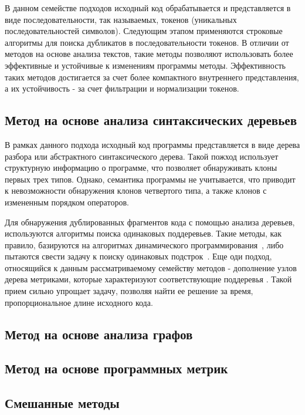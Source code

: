 В данном семействе подходов исходный код обрабатывается и представляется в виде последовательности, так называемых, токенов (уникальных последовательностей символов). Следующим этапом применяются строковые алгоритмы для поиска дубликатов в последовательности токенов. В отличии от методов на основе анализа текстов, такие методы позволяют использовать более эффективные и устойчивые к изменениям программы методы. Эффективность таких методов достигается за счет более компактного внутреннего представления, а их устойчивость - за счет фильтрации и нормализации токенов.

\subsection{Метод на основе анализа синтаксических деревьев}

В рамках данного подхода исходный код программы представляется в виде дерева разбора или абстрактного синтаксического дерева. Такой пожход использует структурную информацию о программе, что позволяет обнаруживать клоны первых трех типов. Однако, семантика программы не учитывается, что приводит к невозможности обнаружения клонов четвертого типа, а также клонов с измененным порядком операторов.

Для обнаружения дублированных фрагментов кода с помощью анализа деревьев, используются алгоритмы поиска одинаковых поддеревьев. Такие методы, как правило, базируются на алгоритмах динамического программирования~\cite{dynamicprog}, либо пытаются свести задачу к поиску одинаковых подстрок~\cite{substrings}. Еще оди подход, относящийся к данным рассматриваемому семейству методов - дополнение узлов дерева метриками, которые характеризуют соответствующие поддеревья	\cite{subtrees}. Такой прием сильно упрощает задачу, позволяя найти ее решение за время, пропорциональное длине исходного кода.

\subsection{Метод на основе анализа графов}



\subsection{Метод на основе программных метрик}



\subsection{Смешанные методы}



